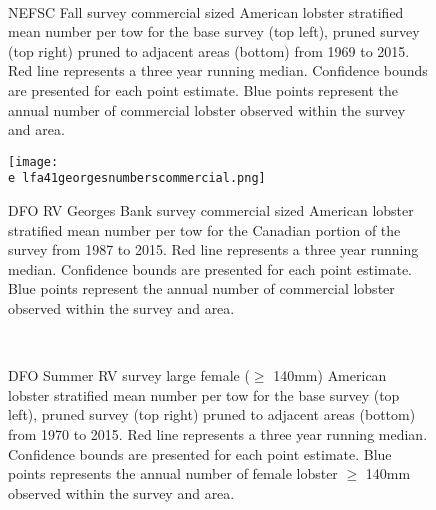 \documentclass[11pt]{article}
\newcommand{\e}{/backup/bio_data/bio.lobster/figures/} %
\begin{document}
\begin{figure}
\centering
{}
\\
\caption{NEFSC Fall survey commercial sized American lobster stratified mean number per tow for the base survey (top left), pruned survey (top right) pruned to adjacent areas (bottom) from 1969 to 2015. Red line represents a three year running median. Confidence bounds are presented for each point estimate. Blue points represent the annual number of commercial lobster observed within the survey and area.}
\end{figure}
\clearpage

\begin{figure}

    \texttt{[image: \\e lfa41georgesnumberscommercial.png]}
    \caption{DFO RV Georges Bank survey commercial sized American lobster stratified mean number per tow for the Canadian portion of the survey from 1987 to 2015. Red line represents a three year running median. Confidence bounds are presented for each point estimate. Blue points represent the annual number of commercial lobster observed within the survey and area.}

\end{figure}



\begin{figure}
\centering
{}
\\
\caption{DFO Summer RV survey large female ($\geq$ 140mm) American lobster stratified mean number per tow for the base survey (top left), pruned survey (top right) pruned to adjacent areas (bottom) from 1970 to 2015. Red line represents a three year running median. Confidence bounds are presented for each point estimate. Blue points represents the annual number of female lobster $\geq$ 140mm observed within the survey and area.}
\end{figure}
\clearpage
\end{document}
